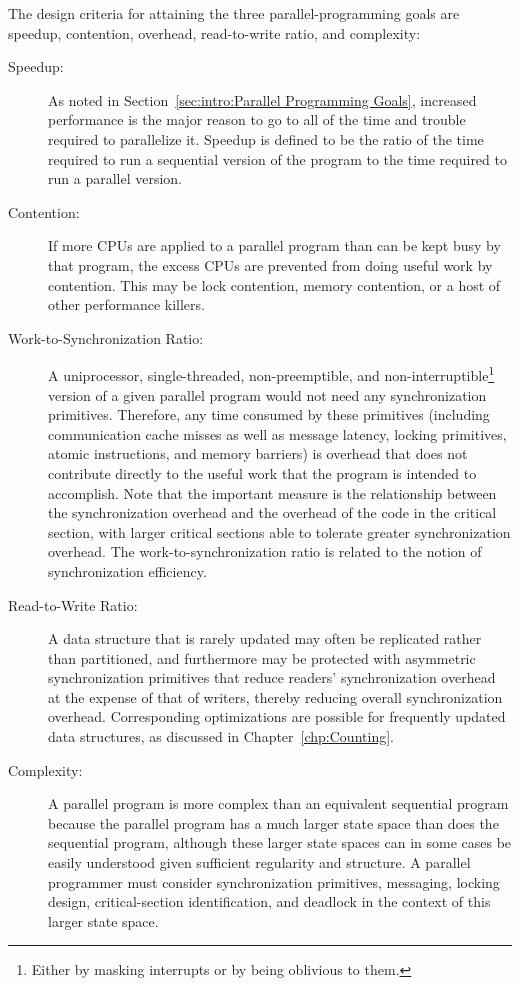 The design criteria for attaining the three parallel-programming goals
are speedup,
contention, overhead, read-to-write ratio, and complexity:
\begin{description}
\item[Speedup:]  As noted in
	Section~\ref{sec:intro:Parallel Programming Goals},
	increased performance is the major reason
	to go to all of the time and trouble
	required to parallelize it.
	Speedup is defined to be the ratio of the time required
	to run a sequential version of the program to the time
	required to run a parallel version.
\item[Contention:]  If more CPUs are applied to a parallel
	program than can be kept busy by that program,
	the excess CPUs are prevented from doing
	useful work by contention.
	This may be lock contention, memory contention, or a host
	of other performance killers.
\item[Work-to-Synchronization Ratio:]  A uniprocessor,
	single-threaded, non-preemptible, and non-interruptible\footnote{
		Either by masking interrupts or by being oblivious to them.}
	version of a given parallel
	program would not need any synchronization primitives.
	Therefore, any time consumed by these primitives
	(including communication cache misses as well as
	message latency, locking primitives, atomic instructions,
	and memory barriers)
	is overhead that does not contribute directly to the useful
	work that the program is intended to accomplish.
	Note that the important measure is the
	relationship between the synchronization overhead
	and the overhead of the code in the critical section, with larger
	critical sections able to tolerate greater synchronization overhead.
	The work-to-synchronization ratio is related to
	the notion of synchronization efficiency.  %
\item[Read-to-Write Ratio:]  A data structure that is
	rarely updated may often be replicated rather than partitioned,
	and furthermore may be protected with asymmetric
	synchronization primitives that reduce readers' synchronization
	overhead at the expense of that of writers, thereby
	reducing overall synchronization overhead.
	Corresponding optimizations are possible for frequently
	updated data structures, as discussed in
	Chapter~\ref{chp:Counting}.
\item[Complexity:]  A parallel program is more complex than
	an equivalent sequential program because the parallel
	program has a much larger state space than does the
	sequential program, although these larger state spaces
	can in some cases be easily understood given sufficient
	regularity and structure.
	A parallel programmer must
	consider synchronization primitives, messaging, locking design,
	critical-section identification,
	and deadlock in the context of this larger state space.


\end{description}
